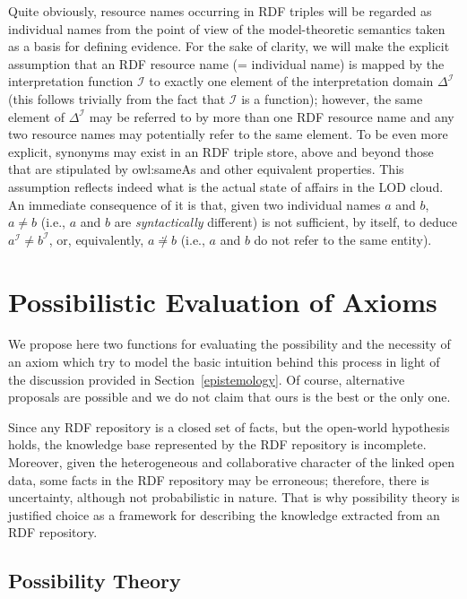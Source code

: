 \documentclass[a4paper]{article}
\newcounter{ex}
\begin{document}
Quite obviously, resource names occurring in RDF triples will be regarded as
individual names from the point of view of the model-theoretic semantics taken as
a basis for defining evidence. For the sake of clarity, we will make the explicit
assumption that an RDF resource name (= individual name) is mapped by the interpretation
function $\mathcal{I}$ to exactly one element of the interpretation domain $\Delta^\mathcal{I}$
(this follows trivially from the fact that $\mathcal{I}$ is a function);
however, the same element of $\Delta^\mathcal{I}$ may be referred to by more than one
RDF resource name and any two resource names may potentially refer to the same element.
To be even more explicit, synonyms may exist in an RDF triple store, above and beyond
those that are stipulated by \textsf{owl:sameAs} and other equivalent properties.
This assumption reflects indeed what is the actual state of affairs in the LOD cloud.
An immediate consequence of it is that, given two individual names $a$ and $b$,
$a \neq b$ (i.e., $a$ and $b$ are \emph{syntactically} different) is not sufficient,
by itself, to deduce $a^\mathcal{I} \neq b^\mathcal{I}$, or, equivalently, $a \not\doteq b$
(i.e., $a$ and $b$ do not refer to the same entity).



\section{Possibilistic Evaluation of Axioms}
\label{possibility-theory}

We propose here two functions for evaluating the possibility and the necessity of
an axiom which try to model the basic intuition behind this process in light of
the discussion provided in Section~\ref{epistemology}.
Of course, alternative proposals are possible and we do not claim that ours is the best or
the only one.

Since any RDF repository is a closed set of facts, but the open-world hypothesis
holds, the knowledge base represented by the RDF repository is incomplete.
Moreover, given the heterogeneous and collaborative character of the linked open data,
some facts in the RDF repository may be erroneous; therefore, there is uncertainty,
although not probabilistic in nature. That is why possibility theory is justified
choice as a framework for describing the knowledge extracted from an RDF repository.

\subsection{Possibility Theory}
\label{PossibilityTheory}
\end{document}
